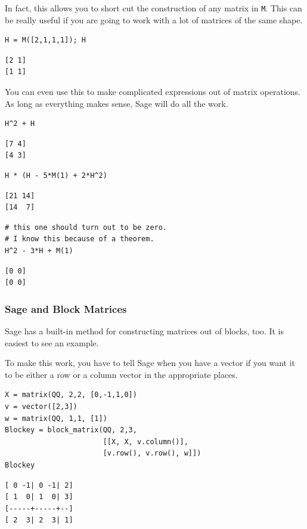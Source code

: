 \documentclass[10pt,]{book}
\theoremstyle{plain}
\numberwithin{equation}{section}
\begin{document}
        In fact, this allows you to short cut the construction of any matrix in
        \verb?M?. This can be really useful if you are going to work with a lot
        of matrices of the same shape.
\begin{lstlisting}[style=sageinput]
H = M([2,1,1,1]); H
\end{lstlisting}
\begin{lstlisting}[style=sageoutput]
[2 1]
[1 1]
\end{lstlisting}
\par
You can even use this to make complicated expressions out of matrix operations.
        As long as everything makes sense, Sage will do all the work.
\begin{lstlisting}[style=sageinput]
H^2 + H
\end{lstlisting}
\begin{lstlisting}[style=sageoutput]
[7 4]
[4 3]
\end{lstlisting}
\begin{lstlisting}[style=sageinput]
H * (H - 5*M(1) + 2*H^2)
\end{lstlisting}
\begin{lstlisting}[style=sageoutput]
[21 14]
[14  7]
\end{lstlisting}
\begin{lstlisting}[style=sageinput]
# this one should turn out to be zero.
# I know this because of a theorem.
H^2 - 3*H + M(1)
\end{lstlisting}
\begin{lstlisting}[style=sageoutput]
[0 0]
[0 0]
\end{lstlisting}
\typeout{************************************************}
\typeout{************************************************}
\subsubsection[Sage and Block Matrices]{Sage and Block Matrices}\label{subsubsection-19}
Sage has a built-in method for constructing matrices out of blocks, too.
        It is easiest to see an example.
\par

        To make this work, you have to tell Sage when you have a vector if you
        want it to be either a row or a column vector in the appropriate places.
\begin{lstlisting}[style=sageinput]
X = matrix(QQ, 2,2, [0,-1,1,0])
v = vector([2,3])
w = matrix(QQ, 1,1, [1])
Blockey = block_matrix(QQ, 2,3,
                       [[X, X, v.column()],
                       [v.row(), v.row(), w]])
Blockey
\end{lstlisting}
\begin{lstlisting}[style=sageoutput]
[ 0 -1| 0 -1| 2]
[ 1  0| 1  0| 3]
[-----+-----+--]
[ 2  3| 2  3| 1]
\end{lstlisting}
\typeout{************************************************}
\typeout{************************************************}
\end{document}
